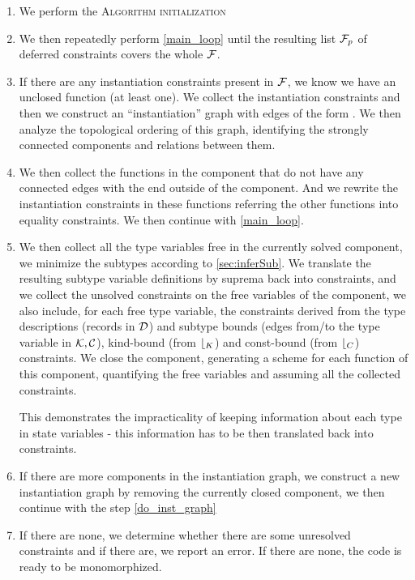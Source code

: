 \begin{enumerate}
    \item We perform the \textsc{Algorithm initialization}

    \item We then repeatedly perform \cref{main_loop} until the resulting list $\mathcal F_p$ of deferred constraints covers the whole $\mathcal{F}$.

    \item If there are any instantiation constraints present in $\mathcal F$, we know we have an unclosed function (at least one). We collect the instantiation constraints and then we construct an ``instantiation'' graph with edges of the form . We then analyze the topological ordering of this graph, identifying the strongly connected components and relations between them.

    \item We then collect the functions in the component that do not have any connected edges with the  end outside of the component. And we rewrite the instantiation constraints in these functions referring the other functions into equality constraints. We then continue with \cref{main_loop}. \label{do_inst_graph}

    \item We then collect all the type variables free in the currently solved component, we minimize the subtypes according to \cref{sec:inferSub}. We translate the resulting subtype variable definitions by suprema back into constraints, and we collect the unsolved constraints on the free variables of the component, we also include, for each free type variable, the constraints derived from the type descriptions (records in $\mathcal{D}$) and subtype bounds (edges from/to the type variable in $\mathcal K, \mathcal C$), kind-bound (from $\mathcal b_K$) and const-bound (from $\mathcal b_C$) constraints. We close the component, generating a scheme for each function of this component, quantifying the free variables and assuming all the collected constraints. \label{closing}

    This demonstrates the impracticality of keeping information about each type in state variables - this information has to be then translated back into constraints.

    \item If there are more components in the instantiation graph, we construct a new instantiation graph by removing the currently closed component, we then continue with the step \ref{do_inst_graph}

    \item If there are none, we determine whether there are some unresolved constraints and if there are, we report an error. If there are none, the code is ready to be monomorphized.
\end{enumerate}


